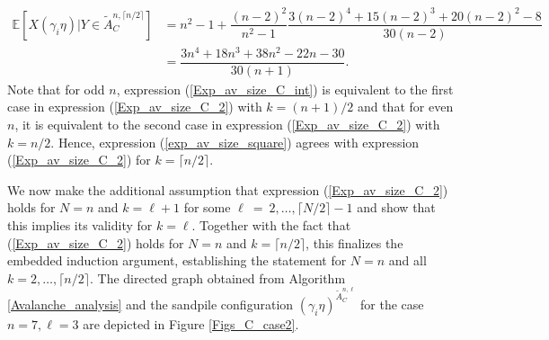 \documentclass{article}
\begin{document}
\begin{align}
    \nonumber \mathbb{E}[X(\gamma_i \eta)|Y \in \tilde{A}^{n, \lceil n/2 \rceil}_C] &= n^2-1 + \dfrac{(n-2)^2}{n^2-1} \dfrac{3(n-2)^4+15(n-2)^3+20(n-2)^2-8}{30(n-2)} \\
    \label{Exp_av_size_C_int} &= \dfrac{3n^4 + 18n^3 + 38n^2 - 22n - 30}{30(n+1)}.
\end{align}
Note that for odd $n$, expression (\ref{Exp_av_size_C_int}) is equivalent to the first case in expression (\ref{Exp_av_size_C_2}) with $k = (n+1)/2$ and that for even $n$, it is equivalent to the second case in expression (\ref{Exp_av_size_C_2}) with $k = n/2$. Hence, expression (\ref{exp_av_size_square}) agrees with expression (\ref{Exp_av_size_C_2}) for $k = \lceil n/2 \rceil$. 

We now make the additional assumption that expression (\ref{Exp_av_size_C_2}) holds for $N = n$ and $k = \ell + 1$ for some $\ell~=~2, \ldots, \lceil N/2 \rceil -1$ and show that this implies its validity for $k = \ell$. Together with the fact that (\ref{Exp_av_size_C_2}) holds for $N = n$ and $k = \lceil n/2 \rceil$, this finalizes the embedded induction argument, establishing the statement for $N = n$ and all $k = 2, \ldots, \lceil n/2 \rceil$. The directed graph obtained from Algorithm \ref{Avalanche_analysis} and the sandpile configuration $(\gamma_i \eta)^{\tilde{A}_C^{n, \ell}}$ for the case $n = 7, \ell = 3$ are depicted in Figure \ref{Figs_C_case2}.
\end{document}
